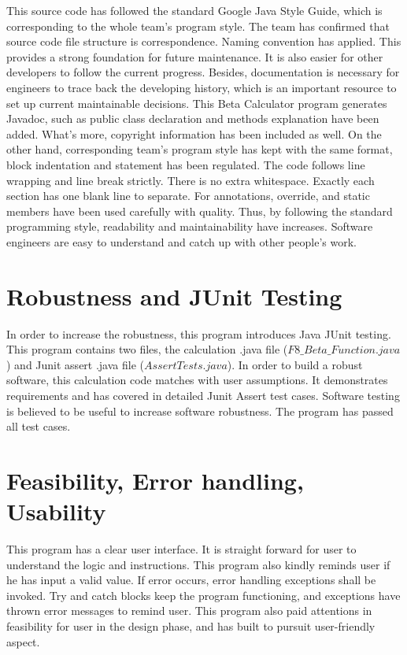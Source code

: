 \documentclass{article}
\begin{document}
This source code has followed the standard Google Java Style Guide, which is corresponding to the whole team’s program style. The team has confirmed that source code file structure is correspondence. Naming convention has applied. This provides a strong foundation for future maintenance. It is also easier for other developers to follow the current progress. Besides, documentation is necessary for engineers to trace back the developing history, which is an important resource to set up current maintainable decisions. This Beta Calculator program generates Javadoc, such as public class declaration and methods explanation have been added. What's more, copyright information has been included as well. On the other hand, corresponding team’s program style has kept with the same format, block indentation and statement has been regulated. The code follows line wrapping and line break strictly. There is no extra whitespace. Exactly each section has one blank line to separate. For annotations, override, and static members have been used carefully with quality. Thus, by following the standard programming style, readability and maintainability have increases. Software engineers are easy to understand and catch up with other people’s work. 


\section{Robustness and JUnit Testing}

In order to increase the robustness, this program introduces Java JUnit testing. This program contains two files, the calculation .java file ($ F8 \_  Beta \_ Function.java $) and Junit assert .java file ($ AssertTests.java $). In order to build a robust software, this calculation code matches with user assumptions. It demonstrates requirements and has covered in detailed Junit Assert test cases. Software testing is believed to be useful to increase software robustness. The program has passed all test cases.


\section{Feasibility, Error handling, Usability}


This program has a clear user interface. It is straight forward for user to understand the logic and instructions. This program also kindly reminds user if he has input a valid value. If error occurs, error handling exceptions shall be invoked. Try and catch blocks keep the program functioning, and exceptions have thrown error messages to remind user. This program also paid attentions in feasibility for user in the design phase, and has built to pursuit user-friendly aspect.
\end{document}
